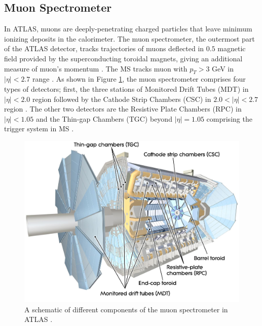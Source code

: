 \subsection{Muon Spectrometer}
\label{subsec:MS}
In ATLAS, muons are deeply-penetrating charged particles that leave minimum ionizing deposits in the calorimeter. The muon spectrometer, the outermost part of the ATLAS detector, tracks trajectories of muons deflected in $0.5$ magnetic field provided by the superconducting toroidal magnets, giving an additional measure of muon's momentum \cite{ATLAS}. The MS tracks muon with $p_{T} > 3$ GeV in $|\eta| < 2.7$ range \cite{ATLAS}. As shown in Figure \ref{fig:ATLAS_MS}, the muon spectrometer comprises four types of detectors; first, the three stations of Monitored Drift Tubes (MDT) in $|\eta| < 2.0$ region followed by the Cathode Strip Chambers (CSC) in  $2.0 < |\eta| < 2.7$ region \cite{ATLAS}. The other two detectors are the Resistive Plate Chambers (RPC) in $|\eta| < 1.05$ and the Thin-gap Chambers (TGC) beyond $|\eta| = 1.05$ comprising the trigger system in MS \cite{ATLAS}. 

\begin{figure}[!htb]
    \centering
    \includegraphics[width=.98\linewidth]{figures/LHC/ATLAS_MS.jpeg}
    \caption{ A schematic of different components of the muon spectrometer in ATLAS \cite{ATLAS}.\label{fig:ATLAS_MS}}
\end{figure}